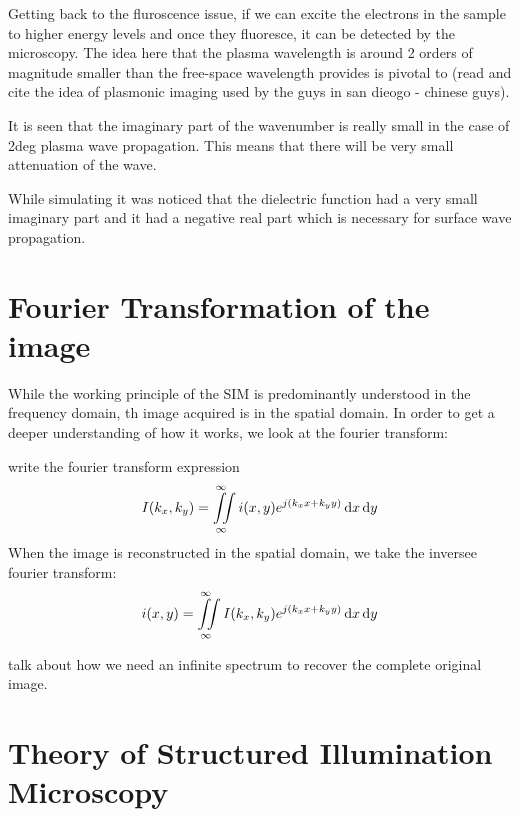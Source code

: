 \documentclass[11pt]{article}
\begin{document}
Getting back to the fluroscence issue, if we can excite the electrons in the sample to higher energy levels and once they fluoresce, it can be detected by the microscopy. The idea here that the plasma wavelength is around 2 orders of magnitude smaller than the free-space wavelength provides is pivotal to (read and cite the idea of plasmonic imaging used by the guys in san dieogo - chinese guys).

It is seen that the imaginary part of the wavenumber is really small in the case of 2deg plasma wave propagation. This means that there will be very small attenuation of the wave.

While simulating it was noticed that the dielectric function had a very small imaginary part and it had a negative real part which is necessary for surface wave propagation.

\section{Fourier Transformation of the image}

While the working principle of the SIM is predominantly understood in the frequency domain, th image acquired is in the spatial domain. In order to get a deeper understanding of how it works, we look at the fourier transform:

write the fourier transform expression
\begin{equation}
  I(k_x, k_y) = \iint \limits_{\infty}^{\infty} i(x,y) e^{j (k_x x + k_y y)} \mathop{}\!\mathrm{d} x \mathop{}\!\mathrm{d} y
  \label{eq:FT}
\end{equation}
When the image is reconstructed in the spatial domain, we take the inversee fourier transform:
\begin{equation}
  i(x, y) = \iint \limits_{\infty}^{\infty} I(k_x,k_y) e^{j (k_x x + k_y y)} \mathop{}\!\mathrm{d} x \mathop{}\!\mathrm{d} y
  \label{eq:IFT}
\end{equation}

talk about how we need an infinite spectrum to recover the complete original image.

\section{Theory of Structured Illumination Microscopy}
\end{document}
